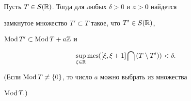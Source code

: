 \begin{lem}


Пусть $T\in S(\Bbb R)$. Тогда для любых $\delta>0$ и $a>0$ найдется


замкнутое множество $T'\subset T$ такое, что $T'\in S(\Bbb R)$,


$\operatorname{Mod} T'\subset\operatorname{Mod} T+a\Bbb Z$ и


$$


\sup_{\xi\in\Bbb R}\mes([\xi,\xi+1]\bigcap\,(T\setminus T'))<\delta.


$$


$($Если $\operatorname{Mod} T\ne\{0\}$, то число $a$ можно выбрать из множества


$\operatorname{Mod} T.)$


\end{lem}





